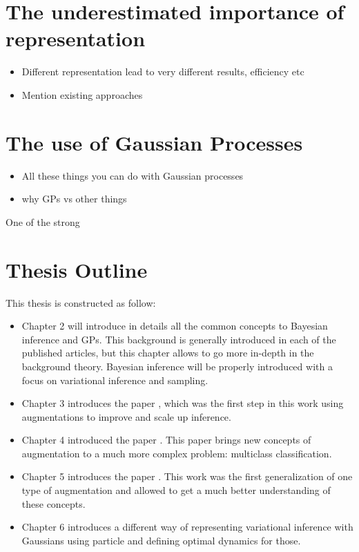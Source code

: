 \section{The underestimated importance of representation}

\begin{itemize}
\item Different representation lead to very different results, efficiency etc
\item Mention existing approaches
\end{itemize}


\section{The use of Gaussian Processes}

\begin{itemize}
\item All these things you can do with Gaussian processes
\item why GPs vs other things
\end{itemize}

One of the strong 

\section{Thesis Outline}

This thesis is constructed as follow:
\begin{itemize}
\item Chapter 2 will introduce in details all the common concepts to Bayesian inference and \ac{GPs}.
This background is generally introduced in each of the published articles, but this chapter allows to go more in-depth in the background theory.
Bayesian inference will be properly introduced with a focus on variational inference and sampling.
\item Chapter 3 introduces the paper , which was the first step in this work using augmentations to improve and scale up inference.
\item Chapter 4 introduced the paper .
This paper brings new concepts of augmentation to a much more complex problem: multiclass classification.
\item Chapter 5 introduces the paper .
This work was the first generalization of one type of augmentation and allowed to get a much better understanding of these concepts.
\item Chapter 6 introduces a different way of representing variational inference with Gaussians using particle and defining optimal dynamics for those.

\end{itemize}

